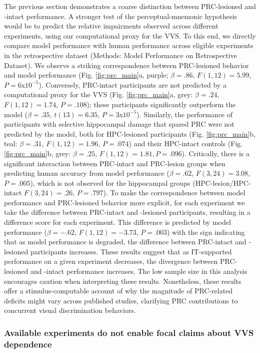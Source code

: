\documentclass[11pt]{article}
\begin{document}
The previous section demonstrates a coarse distinction between PRC-lesioned and -intact performance. A stronger test of the perceptual-mnemonic hypothesis would be to predict the relative impairments observed across different experiments, using our computational proxy for the VVS. To this end, we directly compare model performance with human performance across eligible experiments in the retrospective dataset (Methods: Model Performance on Retrospective Dataset). We observe a striking correspondence between PRC-lesioned behavior and model performance (Fig. \ref{fig:prc_main}a, purple; $\beta = .86$, $F(1, 12) = 5.99$, $P = 6$x$10^{-5}$). Conversely, PRC-intact participants are not predicted by a computational proxy for the VVS (Fig. \ref{fig:prc_main}a, grey: $\beta = .24$, $F(1, 12) = 1.74$, $P = .108$); these participants significantly outperform the model ($\beta = .35$, $t(13) = 6.35$, $P = 3$x$10^{-5}$). Similarly, the performance of participants with selective hippocampal damage that spared PRC were not predicted by the model, both for HPC-lesioned participants (Fig. \ref{fig:prc_main}b, teal: $\beta = .31$, $F(1, 12) = 1.96$, $P = .074$) and their HPC-intact controls (Fig. \ref{fig:prc_main}b, grey: $\beta = .25$, $F(1, 12)$ = $1.81, P = .096$). Critically, there is a significant interaction between PRC-intact and PRC-lesion groups when predicting human accuracy from model performance ($\beta = .62$, $F(3, 24) = 3.08$, $P = .005$), which is not observed for the hippocampal groups (HPC-lesion/HPC-intact $F(3, 24) = .26$, $P = .797$). To make the correspondence between model performance and PRC-lesioned behavior more explicit, for each experiment we take the difference between PRC-intact and -lesioned participants, resulting in a difference score for each experiment. This difference is predicted by model performance ($\beta = -.62$, $F(1, 12) = -3.73$, $P = .003$) with the sign indicating that as model performance is degraded, the difference between PRC-intact and -lesioned participants increases. These results suggest that as IT-supported performance on a given experiment decreases, the divergence between PRC-lesioned and -intact performance increases. The low sample size in this analysis encourages caution when interpreting these results\cite{poldrack2015progress}. Nonetheless, these results offer a stimulus-computable account of why the magnitude of PRC-related deficits might vary across published studies, clarifying PRC contributions to concurrent visual discrimination behaviors. 

\subsubsection{Available experiments do not enable focal claims about VVS dependence}
\end{document}
